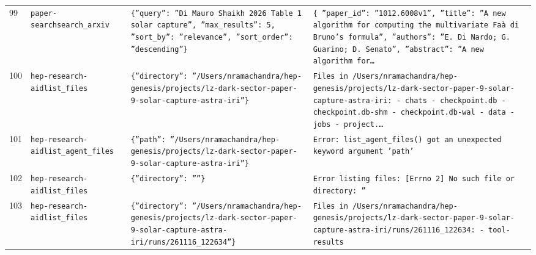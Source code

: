 \documentclass[11pt,a4paper]{article}
\begin{document}
\begin{longtable}{@{}p{}p{}p{}p{}@{}}
99 & \texttt{paper-search}\newline\texttt{search\_\allowbreak{}arxiv} & \texttt{\{''query'':\allowbreak{} ''Di Mauro Shaikh 2026 Table 1 solar capture'',\allowbreak{} ''max\_\allowbreak{}results'':\allowbreak{} 5,\allowbreak{} ''sort\_\allowbreak{}by'':\allowbreak{} ''relevance'',\allowbreak{} ''sort\_\allowbreak{}order'':\allowbreak{} ''descending''\}\allowbreak{}} & \texttt{\{   ''paper\_\allowbreak{}id'':\allowbreak{} ''1012.6008v1'',\allowbreak{}   ''title'':\allowbreak{} ''A new algorithm for computing the multivariate Faà di Bruno's formula'',\allowbreak{}   ''authors'':\allowbreak{} ''E. Di Nardo;\allowbreak{} G. Guarino;\allowbreak{} D. Senato'',\allowbreak{}   ''abstract'':\allowbreak{} ''A new algorithm for\ldots{}\allowbreak{}} \\
100 & \texttt{hep-research-aid}\newline\texttt{list\_\allowbreak{}files} & \texttt{\{''directory'':\allowbreak{} ''/\allowbreak{}Users/\allowbreak{}nramachandra/\allowbreak{}hep-genesis/\allowbreak{}projects/\allowbreak{}lz-dark-sector-paper-9-solar-capture-astra-iri''\}\allowbreak{}} & \texttt{Files in /\allowbreak{}Users/\allowbreak{}nramachandra/\allowbreak{}hep-genesis/\allowbreak{}projects/\allowbreak{}lz-dark-sector-paper-9-solar-capture-astra-iri:\allowbreak{}   - chats   - checkpoint.db   - checkpoint.db-shm   - checkpoint.db-wal   - data   - jobs   - project.\ldots{}\allowbreak{}} \\
101 & \texttt{hep-research-aid}\newline\texttt{list\_\allowbreak{}agent\_\allowbreak{}files} & \texttt{\{''path'':\allowbreak{} ''/\allowbreak{}Users/\allowbreak{}nramachandra/\allowbreak{}hep-genesis/\allowbreak{}projects/\allowbreak{}lz-dark-sector-paper-9-solar-capture-astra-iri''\}\allowbreak{}} & \texttt{Error:\allowbreak{} list\_\allowbreak{}agent\_\allowbreak{}files()\allowbreak{} got an unexpected keyword argument 'path'} \\
102 & \texttt{hep-research-aid}\newline\texttt{list\_\allowbreak{}files} & \texttt{\{''directory'':\allowbreak{} ''''\}\allowbreak{}} & \texttt{Error listing files:\allowbreak{} [Errno 2]\allowbreak{} No such file or directory:\allowbreak{} ''} \\
103 & \texttt{hep-research-aid}\newline\texttt{list\_\allowbreak{}files} & \texttt{\{''directory'':\allowbreak{} ''/\allowbreak{}Users/\allowbreak{}nramachandra/\allowbreak{}hep-genesis/\allowbreak{}projects/\allowbreak{}lz-dark-sector-paper-9-solar-capture-astra-iri/\allowbreak{}runs/\allowbreak{}261116\_\allowbreak{}122634''\}\allowbreak{}} & \texttt{Files in /\allowbreak{}Users/\allowbreak{}nramachandra/\allowbreak{}hep-genesis/\allowbreak{}projects/\allowbreak{}lz-dark-sector-paper-9-solar-capture-astra-iri/\allowbreak{}runs/\allowbreak{}261116\_\allowbreak{}122634:\allowbreak{}   - tool-results} \\

\end{longtable}
\end{document}
